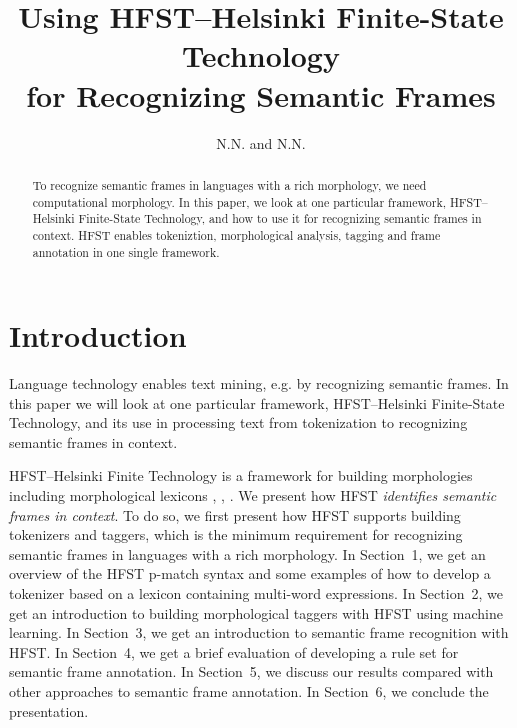 \documentclass{llncs}
\begin{document}
%
\title{Using HFST--Helsinki Finite-State Technology \\for Recognizing Semantic Frames}
%
\author{N.N. and N.N.}


\maketitle


\begin{abstract}
To recognize semantic frames in languages with a rich morphology, we need computational morphology.  
In this paper, we look at one particular framework, HFST--Helsinki Finite-State Technology, and how to
use it for recognizing semantic frames in context.
HFST enables tokeniztion, morphological analysis, tagging and frame annotation in one single framework.
\end{abstract}

\section*{Introduction}
Language technology enables text
mining, e.g. by recognizing semantic frames. In this
paper we will look at one particular framework, HFST--Helsinki
Finite-State Technology, and its use in processing text from tokenization to recognizing
semantic frames in context.

HFST--Helsinki Finite Technology is a framework for building
morphologies including morphological lexicons \cite{hfst-pmatch}, \cite{hfst/2011}, \cite{linden/2009/sfcm}.
We present how HFST \emph{identifies semantic frames in context}.  
To do so, we first present how HFST supports building tokenizers and taggers, which is the minimum
requirement for recognizing semantic frames in languages with a rich morphology.  
In Section~1, we get an overview of the HFST p-match syntax and some examples of how to develop a
tokenizer based on a lexicon containing multi-word expressions.
In Section~2, we get an introduction to
building morphological taggers with HFST using machine learning. In Section~3, we get an introduction to
semantic frame recognition with HFST. In Section~4, we get a brief evaluation
of developing a rule set for semantic frame annotation. In Section~5, we discuss our results compared with other approaches
to semantic frame annotation.
In Section~6, we conclude the presentation.
\end{document}
